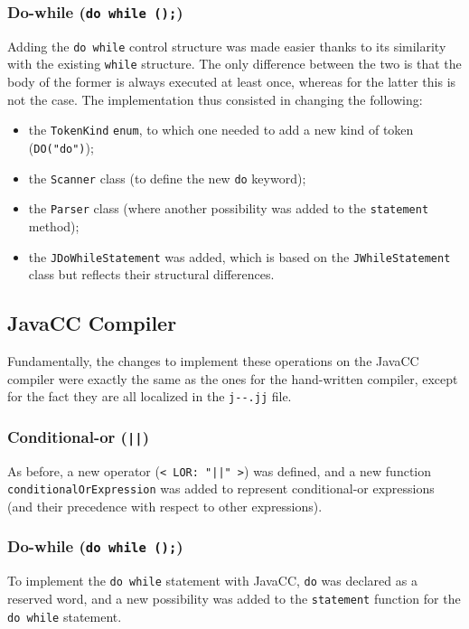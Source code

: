 \documentclass[11pt]{article}
\newcommand{\java}[1]{\texttt{#1}}
\begin{document}
\subsubsection{Do-while (\java{do {} while ();})}
Adding the \java{do while} control structure was made easier thanks to its similarity with the existing \java{while} structure.
The only difference between the two is that the body of the former is always executed at least once, whereas for the latter this is not the case. The implementation thus consisted in changing the following:
\begin{itemize}
	\item the \java{TokenKind} \java{enum}, to which one needed to add a new kind of token (\java{DO("do")});
	\item the \java{Scanner} class (to define the new \java{do} keyword);
	\item the \java{Parser} class (where another possibility was added to the  \java{statement} method);
	\item the \java{JDoWhileStatement} was added, which is based on the \java{JWhileStatement} class but reflects their structural differences.
\end{itemize}

\subsection{JavaCC Compiler}
Fundamentally, the changes to implement these operations on the JavaCC compiler were exactly the same as the ones for the hand-written compiler, except for the fact they are all localized in the \texttt{j-\(\)-.jj} file.

\subsubsection{Conditional-or (\java{||})}
As before, a new operator (\texttt{< LOR: "||" >}) was defined, and a new function \texttt{conditionalOrExpression} was added to represent conditional-or expressions (and their precedence with respect to other expressions).

\subsubsection{Do-while (\java{do {} while ();})}
To implement the \java{do while} statement with JavaCC, \java{do} was declared as a reserved word, and a new possibility was added to the \texttt{statement} function for the \java{do while} statement.
\end{document}
